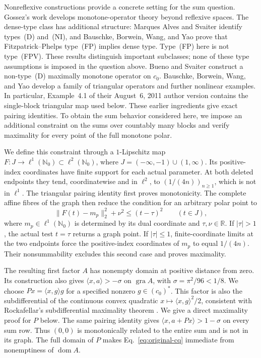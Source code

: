 \documentclass[11pt]{article}
\newcommand{\R}{\mathbb R}
\newcommand{\Nzero}{\mathbb N_0}
\newcommand{\gra}{\operatorname{gra}}
\newcommand{\dom}{\operatorname{dom}}
\begin{document}
Nonreflexive constructions provide a concrete setting for the sum question.
Gossez's work \cite{gossez1971} develops monotone-operator theory beyond
reflexive spaces. The dense-type class has additional structure:
Marques Alves and Svaiter \cite{marquessvaiter2010} identify types~(D)
and~(NI), and Bauschke, Borwein, Wang, and Yao \cite{bauschkefp2012}
prove that Fitzpatrick--Phelps type~(FP) implies dense type.
Type~(FP) here is not type~(FPV). These results distinguish important
subclasses; none of these type assumptions is imposed in the question above.
Bueno and Svaiter \cite{buenosvaiter2011} construct a non-type~(D)
maximally monotone operator on $c_0$. Bauschke, Borwein, Wang, and Yao
\cite{bauschkeetal2011} develop a family of triangular operators and
further nonlinear examples. In particular, Example~4.1 of their
August~6, 2011 author version contains
the single-block triangular map used below. These earlier ingredients
give exact pairing identities. To obtain the sum behavior considered
here, we impose an additional constraint on the sums over countably many
blocks and verify maximality for every point of the full monotone polar.

We define this constraint through a $1$-Lipschitz map
$F:J\to\ell^1(\Nzero)\subset\ell^2(\Nzero)$, where
$J=(-\infty,-1)\cup(1,\infty)$. Its positive-index coordinates have finite
support for each actual parameter. At both deleted endpoints they tend,
coordinatewise and in $\ell^2$, to
$(1/(4n))_{n\ge1}$, which is not in $\ell^1$.
The triangular pairing identity first proves monotonicity. The complete
affine fibres of the graph then reduce the condition for an arbitrary
polar point to
\begin{equation}
\|F(t)-m_p\|_2^2+\nu^2\le(t-\tau)^2
\qquad(t\in J),
\label{eq:polar-intro}
\end{equation}
where $m_p\in\ell^1(\Nzero)$ is determined by its dual coordinate and
$\tau,\nu\in\R$. If $|\tau|>1$, the actual test $t=\tau$ returns a graph
point. If $|\tau|\le1$, finite-coordinate limits at the two endpoints
force the positive-index coordinates of $m_p$ to equal $1/(4n)$.
Their nonsummability excludes this second case and proves maximality.

The resulting first factor $A$ has nonempty domain at positive distance
from zero. Its construction also gives
$\langle x,a\rangle>-\sigma$ on $\gra A$, with
$\sigma=\pi^2/96<1/8$. We choose
$Px=\langle x,g\rangle g$ for a specified nonzero $g\in(c_0)^*$.
This factor is also the subdifferential of the continuous convex quadratic
$x\mapsto\langle x,g\rangle^2/2$, consistent with Rockafellar's
subdifferential maximality theorem \cite{rockafellar1970subdiff}.
We give a direct maximality proof for $P$ below.
The same pairing identity gives
$\langle x,a+Px\rangle>1-\sigma$ on every sum row.
Thus $(0,0)$ is monotonically related to the entire sum and is not in
its graph. The full domain of $P$ makes
Eq.~\eqref{eq:original-cq} immediate from nonemptiness of $\dom A$.
\end{document}
